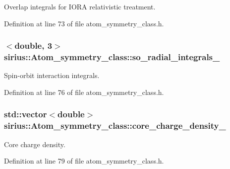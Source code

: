 Overlap integrals for I\+O\+R\+A relativistic treatment. 



Definition at line 73 of file atom\+\_\+symmetry\+\_\+class.\+h.

\hypertarget{classsirius_1_1_atom__symmetry__class_a3320c301ad81367c8a6ce0492150b8c1}{}
\subsubsection[{so\+\_\+radial\+\_\+integrals\+\_\+}]{$<$double, 3$>$ sirius\+::\+Atom\+\_\+symmetry\+\_\+class\+::so\+\_\+radial\+\_\+integrals\+\_\+\hspace{0.3cm}{\ttfamily [private]}}\label{classsirius_1_1_atom__symmetry__class_a3320c301ad81367c8a6ce0492150b8c1}


Spin-\/orbit interaction integrals. 



Definition at line 76 of file atom\+\_\+symmetry\+\_\+class.\+h.

\hypertarget{classsirius_1_1_atom__symmetry__class_ab22e12fabcf60d92a06b5899e6897ba0}{}
\subsubsection[{core\+\_\+charge\+\_\+density\+\_\+}]{\setlength{\rightskip}{0pt plus 5cm}std\+::vector$<$double$>$ sirius\+::\+Atom\+\_\+symmetry\+\_\+class\+::core\+\_\+charge\+\_\+density\+\_\+\hspace{0.3cm}{\ttfamily [private]}}\label{classsirius_1_1_atom__symmetry__class_ab22e12fabcf60d92a06b5899e6897ba0}


Core charge density. 



Definition at line 79 of file atom\+\_\+symmetry\+\_\+class.\+h.

